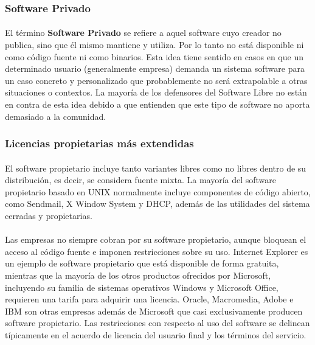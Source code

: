 \documentclass[10pt]{article}
\begin{document}
			\subsubsection{Software Privado}
				
                \paragraph{}
                El término \textbf{Software Privado} se refiere a aquel software cuyo creador no publica, sino que él mismo mantiene y utiliza. Por lo tanto no está disponible ni como código fuente ni como binarios. Esta idea tiene sentido en casos en que un determinado usuario (generalmente empresa) demanda un sistema software para un caso concreto y personalizado que probablemente no será extrapolable a otras situaciones o contextos. La mayoría de los defensores del Software Libre no están en contra de esta idea debido a que entienden que este tipo de software no aporta demasiado a la comunidad.
                
         	\subsubsection{Licencias propietarias más extendidas}
                
                \paragraph{}
                El software propietario incluye tanto variantes libres como no libres dentro de su distribución, es decir, se considera fuente mixta. La mayoría del software propietario basado en UNIX normalmente incluye componentes de código abierto, como Sendmail, X Window System y DHCP, además de las utilidades del sistema cerradas y propietarias.

                \paragraph{}
				Las empresas no siempre cobran por su software propietario, aunque bloquean el acceso al código fuente e imponen restricciones sobre su uso. Internet Explorer es un ejemplo de software propietario que está disponible de forma gratuita, mientras que la mayoría de los otros productos ofrecidos por Microsoft, incluyendo su familia de sistemas operativos Windows y Microsoft Office, requieren una tarifa para adquirir una licencia. Oracle, Macromedia, Adobe e IBM son otras empresas además de Microsoft que casi exclusivamente producen software propietario. Las restricciones con respecto al uso del software se delinean típicamente en el acuerdo de licencia del usuario final y los términos del servicio.
\end{document}

